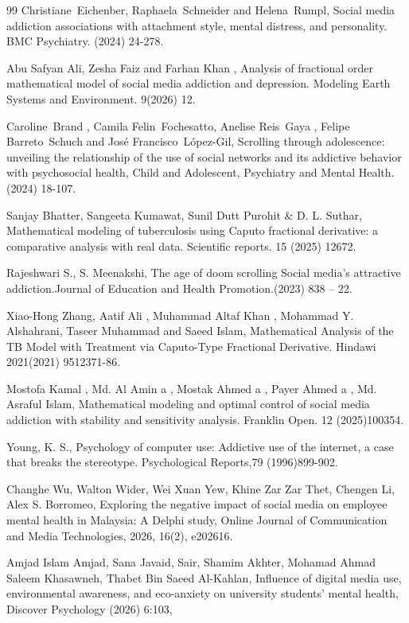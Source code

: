 \documentclass[10pt]{NSP1}
\begin{document}
\begin{thebibliography}{99}
Christiane Eichenber, Raphaela Schneider and Helena Rumpl, Social media addiction associations with attachment style, mental distress, and personality. BMC Psychiatry. (2024) 24-278.

Abu Safyan Ali, Zesha Faiz and Farhan Khan , Analysis of fractional order mathematical model of social media addiction and depression. Modeling Earth Systems and Environment. 9(2026) 12.

Caroline Brand , Camila Felin Fochesatto, Anelise Reis Gaya , Felipe Barreto Schuch and José Francisco López-Gil, Scrolling through adolescence: unveiling the relationship of the use of social networks and its addictive behavior with psychosocial health, Child and Adolescent, Psychiatry and Mental Health. (2024) 18-107.

Sanjay Bhatter, Sangeeta Kumawat, Sunil Dutt Purohit \& D. L. Suthar, Mathematical modeling of tuberculosis using Caputo fractional derivative: a comparative analysis with real data. Scientific reports. 15 (2025) 12672.

Rajeshwari S., S. Meenakshi, The age of doom scrolling Social media’s attractive addiction.Journal of Education and Health Promotion.(2023) 838 – 22.

Xiao-Hong Zhang, Aatif Ali , Muhammad Altaf Khan , Mohammad Y. Alshahrani, Taseer Muhammad and Saeed Islam, Mathematical Analysis of the TB Model with Treatment via Caputo-Type Fractional Derivative. Hindawi 2021(2021) 9512371-86.

Mostofa Kamal , Md. Al Amin a , Mostak Ahmed a , Payer Ahmed a , Md. Asraful Islam, Mathematical modeling and optimal control of social media addiction with stability and sensitivity analysis. Franklin Open. 12 (2025)100354.

Young, K. S., Psychology of computer use: Addictive use of the internet, a case that breaks the stereotype. Psychological Reports,79 (1996)899-902.

Changhe Wu, Walton Wider, Wei Xuan Yew, Khine Zar Zar Thet, Chengen Li, Alex S. Borromeo, Exploring the negative impact of social media on employee mental health in Malaysia: A Delphi study, Online Journal of Communication and Media Technologies, 2026, 16(2), e202616.

Amjad Islam Amjad, Sana Javaid, Sair, Shamim Akhter, Mohamad Ahmad Saleem Khasawneh, Thabet Bin Saeed Al-Kahlan, Influence of digital media use, environmental awareness, and eco-anxiety on university students’ mental health, Discover Psychology (2026) 6:103,


\end{thebibliography}
\end{document}
